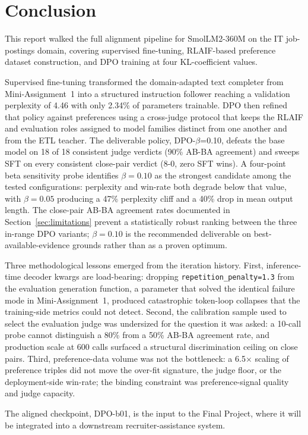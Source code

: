 \documentclass[../main.tex]{subfiles}
\begin{document}
\section{Conclusion}
\label{sec:conclusion}

This report walked the full alignment pipeline for SmolLM2-360M on the IT job-postings domain, covering supervised fine-tuning, RLAIF-based preference dataset construction, and DPO training at four KL-coefficient values.

Supervised fine-tuning transformed the domain-adapted text completer from Mini-Assignment~1 into a structured instruction follower reaching a validation perplexity of 4.46 with only 2.34\% of parameters trainable. DPO then refined that policy against preferences using a cross-judge protocol that keeps the RLAIF and evaluation roles assigned to model families distinct from one another and from the ETL teacher. The deliverable policy, DPO-$\beta$=0.10, defeats the base model on 18 of 18 consistent judge verdicts (90\% AB-BA agreement) and sweeps SFT on every consistent close-pair verdict (8-0, zero SFT wins). A four-point beta sensitivity probe identifies $\beta = 0.10$ as the strongest candidate among the tested configurations: perplexity and win-rate both degrade below that value, with $\beta = 0.05$ producing a 47\% perplexity cliff and a 40\% drop in mean output length. The close-pair AB-BA agreement rates documented in Section~\ref{sec:limitations} prevent a statistically robust ranking between the three in-range DPO variants; $\beta = 0.10$ is the recommended deliverable on best-available-evidence grounds rather than as a proven optimum.

Three methodological lessons emerged from the iteration history. First, inference-time decoder kwargs are load-bearing: dropping \texttt{repetition\_penalty=1.3} from the evaluation generation function, a parameter that solved the identical failure mode in Mini-Assignment~1, produced catastrophic token-loop collapses that the training-side metrics could not detect. Second, the calibration sample used to select the evaluation judge was undersized for the question it was asked: a 10-call probe cannot distinguish a 80\% from a 50\% AB-BA agreement rate, and production scale at 600 calls surfaced a structural discrimination ceiling on close pairs. Third, preference-data volume was not the bottleneck: a 6.5$\times$ scaling of preference triples did not move the over-fit signature, the judge floor, or the deployment-side win-rate; the binding constraint was preference-signal quality and judge capacity.

The aligned checkpoint, DPO-b01, is the input to the Final Project, where it will be integrated into a downstream recruiter-assistance system.
\end{document}
